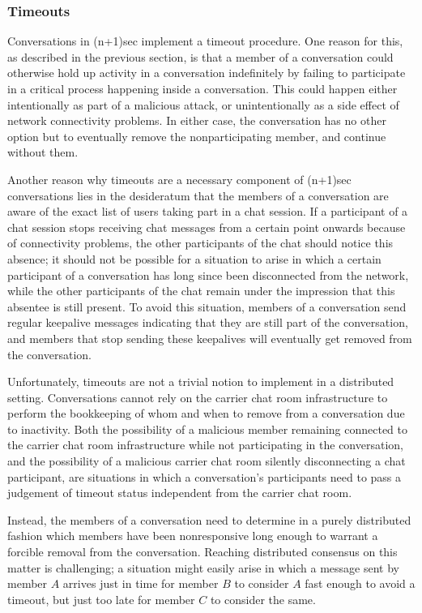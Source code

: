 \documentclass{article}
\begin{document}
\subsubsection{Timeouts}
\label{sec:conversation-state-machine/contents/timeouts}

Conversations in (n+1)sec implement a timeout procedure.
One reason for this, as described in the previous section, is that a member of a conversation could otherwise hold up activity in a conversation indefinitely by failing to participate in a critical process happening inside a conversation.
This could happen either intentionally as part of a malicious attack, or unintentionally as a side effect of network connectivity problems.
In either case, the conversation has no other option but to eventually remove the nonparticipating member, and continue without them.

Another reason why timeouts are a necessary component of (n+1)sec conversations lies in the desideratum that the members of a conversation are aware of the exact list of users taking part in a chat session.
If a participant of a chat session stops receiving chat messages from a certain point onwards because of connectivity problems, the other participants of the chat should notice this absence; it should not be possible for a situation to arise in which a certain participant of a conversation has long since been disconnected from the network, while the other participants of the chat remain under the impression that this absentee is still present.
To avoid this situation, members of a conversation send regular keepalive messages indicating that they are still part of the conversation, and members that stop sending these keepalives will eventually get removed from the conversation.

Unfortunately, timeouts are not a trivial notion to implement in a distributed setting.
Conversations cannot rely on the carrier chat room infrastructure to perform the bookkeeping of whom and when to remove from a conversation due to inactivity.
Both the possibility of a malicious member remaining connected to the carrier chat room infrastructure while not participating in the conversation, and the possibility of a malicious carrier chat room silently disconnecting a chat participant, are situations in which a conversation's participants need to pass a judgement of timeout status independent from the carrier chat room.

Instead, the members of a conversation need to determine in a purely distributed fashion which members have been nonresponsive long enough to warrant a forcible removal from the conversation.
Reaching distributed consensus on this matter is challenging; a situation might easily arise in which a message sent by member $A$ arrives just in time for member $B$ to consider $A$ fast enough to avoid a timeout, but just too late for member $C$ to consider the same.
\end{document}

